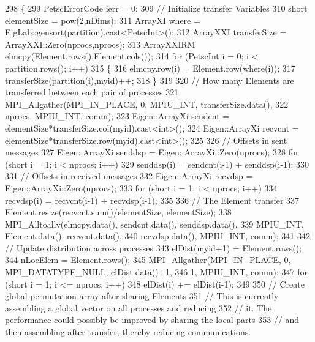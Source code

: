 \begin{DoxyCode}
298 \{
299   PetscErrorCode ierr = 0;
309   \textcolor{comment}{// Initialize transfer Variables}
310   \textcolor{keywordtype}{short} elementSize = pow(2,nDims);
311   ArrayXI where = EigLab::gensort(partition).cast<PetscInt>();
312   ArrayXXI transferSize = ArrayXXI::Zero(nprocs,nprocs);
313   ArrayXXIRM elmcpy(Element.rows(),Element.cols());
314   \textcolor{keywordflow}{for} (PetscInt i = 0; i < partition.rows(); i++)
315   \{
316     elmcpy.row(i) = Element.row(where(i));
317     transferSize(partition(i),myid)++;
318   \}
319 
320   \textcolor{comment}{// How many Elements are transferred between each pair of processes}
321   MPI\_Allgather(MPI\_IN\_PLACE, 0, MPIU\_INT, transferSize.data(),
322                 nprocs, MPIU\_INT, comm);
323   Eigen::ArrayXi sendcnt = elementSize*transferSize.col(myid).cast<\textcolor{keywordtype}{int}>();
324   Eigen::ArrayXi recvcnt = elementSize*transferSize.row(myid).cast<\textcolor{keywordtype}{int}>();
325 
326   \textcolor{comment}{// Offsets in sent messages}
327   Eigen::ArrayXi senddsp = Eigen::ArrayXi::Zero(nprocs);
328   \textcolor{keywordflow}{for} (\textcolor{keywordtype}{short} i = 1; i < nprocs; i++)
329     senddsp(i) = sendcnt(i-1) + senddsp(i-1);
330 
331   \textcolor{comment}{// Offsets in received messages}
332   Eigen::ArrayXi recvdsp = Eigen::ArrayXi::Zero(nprocs);
333   \textcolor{keywordflow}{for} (\textcolor{keywordtype}{short} i = 1; i < nprocs; i++)
334     recvdsp(i) = recvcnt(i-1) + recvdsp(i-1);
335 
336   \textcolor{comment}{// The Element transfer}
337   Element.resize(recvcnt.sum()/elementSize, elementSize);
338   MPI\_Alltoallv(elmcpy.data(), sendcnt.data(), senddsp.data(),
339                 MPIU\_INT, Element.data(), recvcnt.data(),
340                 recvdsp.data(), MPIU\_INT, comm);
341 
342   \textcolor{comment}{// Update distribution across processes}
343   elDist(myid+1) = Element.rows();
344   nLocElem = Element.rows();
345   MPI\_Allgather(MPI\_IN\_PLACE, 0, MPI\_DATATYPE\_NULL, elDist.data()+1,
346                 1, MPIU\_INT, comm);
347   \textcolor{keywordflow}{for} (\textcolor{keywordtype}{short} i = 1; i <= nprocs; i++)
348     elDist(i) += elDist(i-1);
349 
350   \textcolor{comment}{// Create global permutation array after sharing Elements}
351   \textcolor{comment}{// This is currently assembling a global vector on all processes and reducing}
352   \textcolor{comment}{// it.  The performance could possibly be improved by sharing the local parts}
353   \textcolor{comment}{// and then assembling after transfer, thereby reducing communications.}

\end{DoxyCode}
